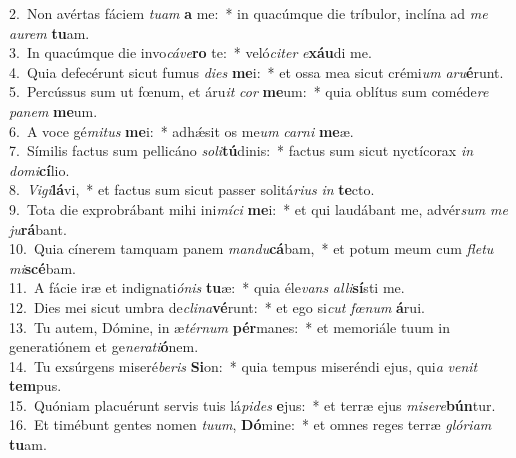 {2.~}Non avértas fáciem \textit{tu}\textit{am} \textbf{a} me:~* in quacúmque die tríbulor, inclína ad \textit{me} \textit{au}\textit{rem} \textbf{tu}am.\\
{3.~}In quacúmque die invo\textit{cá}\textit{ve}\textbf{ro} te:~* veló\textit{ci}\textit{ter} \textit{e}\textbf{xáu}di me.\\
{4.~}Quia defecérunt sicut fumus \textit{di}\textit{es} \textbf{me}i:~* et ossa mea sicut crémi\textit{um} \textit{a}\textit{ru}\textbf{é}runt.\\
{5.~}Percússus sum ut fœnum, et áru\textit{it} \textit{cor} \textbf{me}um:~* quia oblítus sum coméde\textit{re} \textit{pa}\textit{nem} \textbf{me}um.\\
{6.~}A voce gé\textit{mi}\textit{tus} \textbf{me}i:~* adhǽsit os me\textit{um} \textit{car}\textit{ni} \textbf{me}æ.\\
{7.~}Símilis factus sum pellicáno \textit{so}\textit{li}\textbf{tú}dinis:~* factus sum sicut nyctícorax \textit{in} \textit{do}\textit{mi}\textbf{cí}lio.\\
{8.~}\textit{Vi}\textit{gi}\textbf{lá}vi,~* et factus sum sicut passer solitá\textit{ri}\textit{us} \textit{in} \textbf{te}cto.\\
{9.~}Tota die exprobrábant mihi ini\textit{mí}\textit{ci} \textbf{me}i:~* et qui laudábant me, advér\textit{sum} \textit{me} \textit{ju}\textbf{rá}bant.\\
{10.~}Quia cínerem tamquam panem \textit{man}\textit{du}\textbf{cá}bam,~* et potum meum cum \textit{fle}\textit{tu} \textit{mi}\textbf{scé}bam.\\
{11.~}A fácie iræ et indignati\textit{ó}\textit{nis} \textbf{tu}æ:~* quia éle\textit{vans} \textit{al}\textit{li}\textbf{sí}sti me.\\
{12.~}Dies mei sicut umbra de\textit{cli}\textit{na}\textbf{vé}runt:~* et ego si\textit{cut} \textit{fœ}\textit{num} \textbf{á}rui.\\
{13.~}Tu autem, Dómine, in æ\textit{tér}\textit{num} \textbf{pér}manes:~* et memoriále tuum in generatiónem et ge\textit{ne}\textit{ra}\textit{ti}\textbf{ó}nem.\\
{14.~}Tu exsúrgens miseré\textit{be}\textit{ris} \textbf{Si}on:~* quia tempus miseréndi ejus, qui\textit{a} \textit{ve}\textit{nit} \textbf{tem}pus.\\
{15.~}Quóniam placuérunt servis tuis lá\textit{pi}\textit{des} \textbf{e}jus:~* et terræ ejus \textit{mi}\textit{se}\textit{re}\textbf{bún}tur.\\
{16.~}Et timébunt gentes nomen \textit{tu}\textit{um}, \textbf{Dó}mine:~* et omnes reges terræ \textit{gló}\textit{ri}\textit{am} \textbf{tu}am.\\
